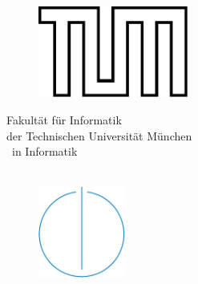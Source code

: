 \thispagestyle{empty}

\hphantom{placeholder to make vspace work}
\vspace{2cm}
\begin{center}
	\begin{figure}[h!]
		\centering
		\includegraphics[height=3cm]{tum.pdf}
	\end{figure}
	\vspace{0.5cm}
	{\Large{} Fakultät für Informatik}\\ 
	\vspace{0.5cm}
	{\large{} der Technischen Universität München}\\
    \vspace{2cm}
	{\Large \makeatletter\@Doctype\makeatother\ in Informatik}\\
	\vspace{1cm}
	{\sffamily\LARGE \makeatletter\@title\makeatother}\\
	\vspace{1cm}
	{\Large \makeatletter\@author\makeatother}
	\vspace{1cm}
	\begin{figure}[h!]
		\centering
		\includegraphics[height=3cm]{in_tum.pdf}
	\end{figure}
\end{center}
\clearpage
